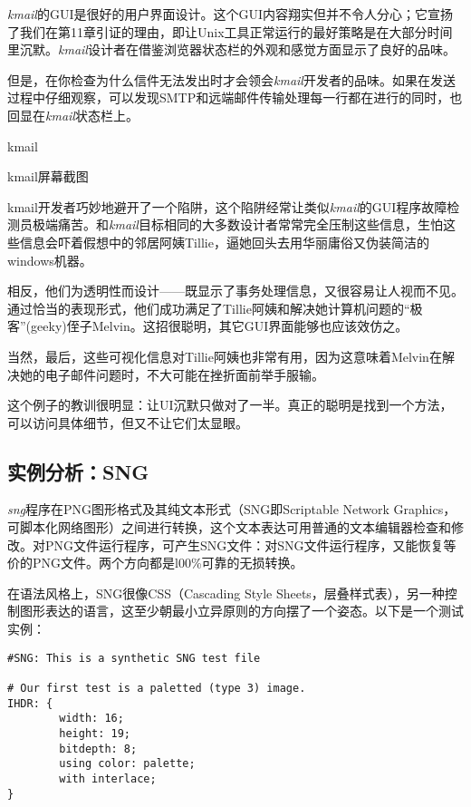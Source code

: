 \documentclass[12pt,oneside]{book}
\begin{document}
\begin{common-format}
\textit{kmail}的GUI是很好的用户界面设计。这个GUI内容翔实但并不令人分心；它宣扬了我们在第11章引证的理由，即让Unix工具正常运行的最好策略是在大部分时间里沉默。\textit{kmail}设计者在借鉴浏览器状态栏的外观和感觉方面显示了良好的品味。

但是，在你检查为什么信件无法发出时才会领会\textit{kmail}开发者的品味。如果在发送过程中仔细观察，可以发现SMTP和远端邮件传输处理每一行都在进行的同时，也回显在\textit{kmail}状态栏上。

\begin{linefig}{kmail}
\caption{kmail屏幕截图}
\label{fig:kmail}
\end{linefig}

kmail开发者巧妙地避开了一个陷阱，这个陷阱经常让类似\textit{kmail}的GUI程序故障检测员极端痛苦。和\textit{kmail}目标相同的大多数设计者常常完全压制这些信息，生怕这些信息会吓着假想中的邻居阿姨Tillie，逼她回头去用华丽庸俗又伪装简洁的windows机器。

相反，他们为透明性而设计——既显示了事务处理信息，又很容易让人视而不见。通过恰当的表现形式，他们成功满足了Tillie阿姨和解决她计算机问题的“极客”(geeky)侄子Melvin。这招很聪明，其它GUI界面能够也应该效仿之。

当然，最后，这些可视化信息对Tillie阿姨也非常有用，因为这意味着Melvin在解决她的电子邮件问题时，不大可能在挫折面前举手服输。

这个例子的教训很明显：让UI沉默只做对了一半。真正的聪明是找到一个方法，可以访问具体细节，但又不让它们太显眼。



\subsection{实例分析：SNG}
\textit{sng}程序在PNG图形格式及其纯文本形式（SNG即Scriptable Network Graphics，可脚本化网络图形）之间进行转换，这个文本表达可用普通的文本编辑器检查和修改。对PNG文件运行程序，可产生SNG文件：对SNG文件运行程序，又能恢复等价的PNG文件。两个方向都是l00\%{}可靠的无损转换。

在语法风格上，SNG很像CSS（Cascading Style Sheets，层叠样式表），另一种控制图形表达的语言，这至少朝最小立异原则的方向摆了一个姿态。以下是一个测试实例：

\begin{Verbatim}[label=例6.2  SNG实例]
#SNG: This is a synthetic SNG test file

# Our first test is a paletted (type 3) image.
IHDR: {
        width: 16;
        height: 19;
        bitdepth: 8;
        using color: palette; 
        with interlace;
}


\end{Verbatim}
\end{common-format}
\end{document}
